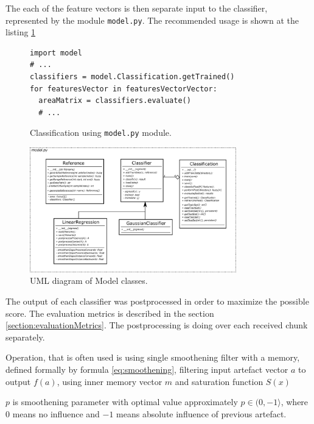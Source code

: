The each of the feature vectors is then separate input to the classifier, represented by the module
\texttt{model.py}. The recommended usage is shown at the listing \ref{listing:classification}

\begin{figure}[!ht]
\begin{lstlisting}[style=python]
import model
# ...
classifiers = model.Classification.getTrained()
for featuresVector in featuresVectorVector:
  areaMatrix = classifiers.evaluate()
  # ...
\end{lstlisting}
\caption{Classification using \texttt{model.py} module.\label{listing:classification}}
\end{figure}

\begin{figure}[!ht]
\begin{center}
\includegraphics[width=0.8\textwidth]{img/class_model.png}
\caption{UML diagram of Model classes. \label{fig:class_model}}
\end{center}
\end{figure}

The output of each classifier was postprocessed in order to maximize the possible score. The evaluation
metrics is described in the section \ref{section:evaluationMetrics}. The postprocessing is doing over each
received chunk separately.

Operation, that is often used is using single smoothening filter with a memory,
defined formally by formula \ref{eq:smoothening}, filtering input artefact vector $a$ to
output $f(a)$, using inner memory vector $m$ and saturation function $S(x)$

$p$ is smoothening parameter with optimal value approximately $p \in (0,-1\rangle$,
where 0 means no influence and $-1$ means absolute influence of previous artefact.


